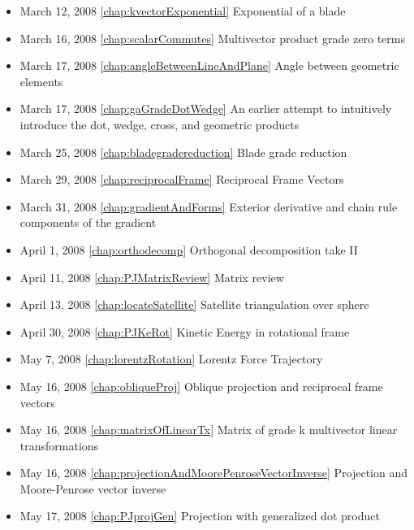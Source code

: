 \begin{itemize}
\item March 12, 2008 \ref{chap:kvectorExponential} Exponential of a blade

\item March 16, 2008 \ref{chap:scalarCommutes} Multivector product grade zero terms

\item March 17, 2008 \ref{chap:angleBetweenLineAndPlane} Angle between geometric elements

\item March 17, 2008 \ref{chap:gaGradeDotWedge} An earlier attempt to intuitively introduce the dot, wedge, cross, and geometric products

\item March 25, 2008 \ref{chap:bladegradereduction} Blade grade reduction

\item March 29, 2008 \ref{chap:reciprocalFrame} Reciprocal Frame Vectors

\item March 31, 2008 \ref{chap:gradientAndForms} Exterior derivative and chain rule components of the gradient

\item April 1, 2008 \ref{chap:orthodecomp} Orthogonal decomposition take II

\item April 11, 2008 \ref{chap:PJMatrixReview} Matrix review

\item April 13, 2008 \ref{chap:locateSatellite} Satellite triangulation over sphere

\item April 30, 2008 \ref{chap:PJKeRot} Kinetic Energy in rotational frame

\item May 7, 2008 \ref{chap:lorentzRotation} Lorentz Force Trajectory

\item May 16, 2008 \ref{chap:obliqueProj} Oblique projection and reciprocal frame vectors

\item May 16, 2008 \ref{chap:matrixOfLinearTx} Matrix of grade k multivector linear transformations

\item May 16, 2008 \ref{chap:projectionAndMoorePenroseVectorInverse} Projection and Moore-Penrose vector inverse

\item May 17, 2008 \ref{chap:PJprojGen} Projection with generalized dot product


\end{itemize}
